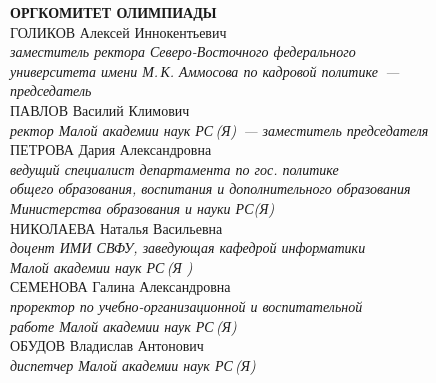 \newpage
\noindent
\textbf{ОРГКОМИТЕТ ОЛИМПИАДЫ}
\\[3mm]
ГОЛИКОВ Алексей Иннокентьевич \\ 
\textit{заместитель ректора Северо-Восточного федерального \\
университета имени М.\,К. Аммосова по кадровой политике~--- \\
председатель}
\\[3mm]
ПАВЛОВ Василий Климович \\
\textit{ректор Малой академии наук РС\,(Я)~--- заместитель председателя}
\\[3mm]
ПЕТРОВА Дария Александровна \\
\textit{ведущий специалист департамента по гос. политике \\
общего образования, воспитания и дополнительного образования \\
Министерства образования и науки РС(Я)}
\\[3mm]
НИКОЛАЕВА Наталья Васильевна \\
\textit{доцент ИМИ СВФУ, заведующая кафедрой информатики \\
Малой академии наук РС\,(Я  )}
\\[3mm]
СЕМЕНОВА Галина Александровна \\
\textit{проректор по учебно-организационной и воспитательной \\ 
работе Малой академии наук РС\,(Я)} 
\\[3mm]
ОБУДОВ Владислав Антонович \\
\textit{диспетчер  Малой академии наук РС\,(Я)}
\\[3mm]

\newpage

